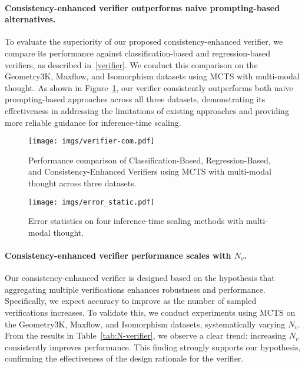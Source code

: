 \paragraph{Consistency-enhanced verifier outperforms naive prompting-based alternatives.}

To evaluate the superiority of our proposed consistency-enhanced verifier, we compare its performance against classification-based and regression-based verifiers, as described in~\textsection\ref{verifier}. We conduct this comparison on the Geometry3K, Maxflow, and Isomorphism datasets using MCTS with multi-modal thought. As shown in Figure~\ref{fig:verifier-com}, our verifier consistently outperforms both naive prompting-based approaches across all three datasets, demonstrating its effectiveness in addressing the limitations of existing approaches and providing more reliable guidance for inference-time scaling.




\begin{figure}[t]
    \centering
  \texttt{[image: imgs/verifier-com.pdf]}
  \caption{Performance comparison of Classification-Based, Regression-Based, and Consistency-Enhanced Verifiers using MCTS with multi-modal thought across three datasets.}
  \label{fig:verifier-com}
\end{figure}

\begin{figure}[t]
  \texttt{[image: imgs/error\_static.pdf]}
  \caption{Error statistics on four inference-time scaling methods with multi-modal thought.}
  \label{fig:error_static}
\end{figure}

\paragraph{Consistency-enhanced verifier performance scales with $N_v$.}

Our consistency-enhanced verifier is designed based on the hypothesis that aggregating multiple verifications enhances robustness and performance. Specifically, we expect accuracy to improve as the number of sampled verifications increases. To validate this, we conduct experiments using MCTS on the Geometry3K, Maxflow, and Isomorphism datasets, systematically varying $N_v$. From the results in Table~\ref{tab:N-verifier}, we observe a clear trend: increasing $N_v$ consistently improves performance. This finding strongly supports our hypothesis, confirming the effectiveness of the design rationale for the verifier.





